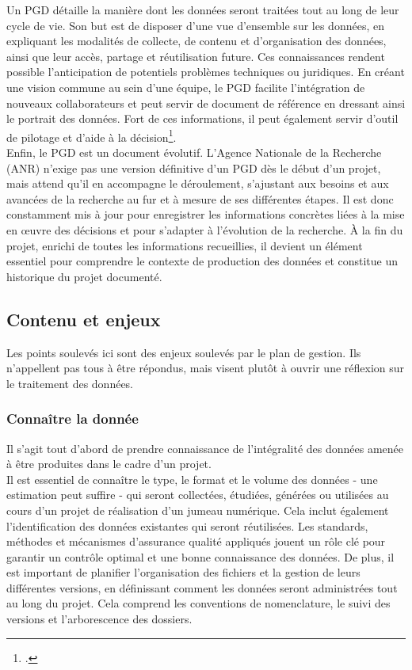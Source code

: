 Un PGD détaille la manière dont les données seront traitées tout au long de leur cycle de vie. Son but est de disposer d’une vue d'ensemble sur les données, en expliquant les modalités de collecte, de contenu et d'organisation des données, ainsi que leur accès, partage et réutilisation future. Ces connaissances rendent possible l’anticipation de potentiels problèmes techniques ou juridiques. En créant une vision commune au sein d'une équipe, le PGD facilite l'intégration de nouveaux collaborateurs et peut servir de document de référence en dressant ainsi le portrait des données. Fort de ces informations, il peut également servir d'outil de pilotage et d’aide à la décision\footcite{elisaCommentElaborerPlan2022}.\\

Enfin, le PGD est un document évolutif. L'Agence Nationale de la Recherche (ANR) n'exige pas une version définitive d’un PGD dès le début d’un projet, mais attend qu'il en accompagne le déroulement, s'ajustant aux besoins et aux avancées de la recherche au fur et à mesure de ses différentes étapes. Il est donc constamment mis à jour pour enregistrer les informations concrètes liées à la mise en œuvre des décisions et pour s’adapter à l’évolution de la recherche. À la fin du projet, enrichi de toutes les informations recueillies, il devient un élément essentiel pour comprendre le contexte de production des données et constitue un historique du projet documenté.

        \subsection{Contenu et enjeux}

Les points soulevés ici sont des enjeux soulevés par le plan de gestion. Ils n’appellent pas tous à être répondus, mais visent plutôt à ouvrir une réflexion sur le traitement des données.

            \subsubsection{Connaître la donnée}
Il s’agit tout d’abord de prendre connaissance de l’intégralité des données amenée à être produites dans le cadre d’un projet.\\

Il est essentiel de connaître le type, le format et le volume des données - une estimation peut suffire - qui seront collectées, étudiées, générées ou utilisées au cours d’un projet de réalisation d’un jumeau numérique. Cela inclut également l’identification des données existantes qui seront réutilisées. Les standards, méthodes et mécanismes d’assurance qualité appliqués jouent un rôle clé pour garantir un contrôle optimal et une bonne connaissance des données. De plus, il est important de planifier l’organisation des fichiers et la gestion de leurs différentes versions, en définissant comment les données seront administrées tout au long du projet. Cela comprend les conventions de nomenclature, le suivi des versions et l’arborescence des dossiers.\\

